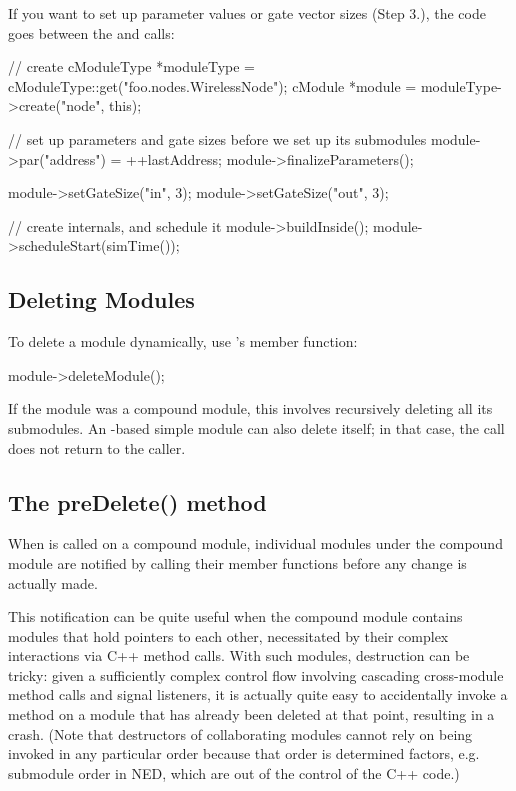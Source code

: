 If you want to set up parameter values or gate vector sizes (Step 3.),
the code goes between the  and
 calls:

\begin{cpp}
// create
cModuleType *moduleType = cModuleType::get("foo.nodes.WirelessNode");
cModule *module = moduleType->create("node", this);

// set up parameters and gate sizes before we set up its submodules
module->par("address") = ++lastAddress;
module->finalizeParameters();

module->setGateSize("in", 3);
module->setGateSize("out", 3);

// create internals, and schedule it
module->buildInside();
module->scheduleStart(simTime());
\end{cpp}


\subsection{Deleting Modules}
\label{sec:simple-modules:deleting-modules}

To delete a module dynamically, use
's  member function:

\begin{cpp}
module->deleteModule();
\end{cpp}

If the module was a compound module, this involves recursively
deleting all its submodules. An -based simple module
can also delete itself; in that case, the  call
does not return to the caller.


\subsection{The preDelete() method}
\label{sec:simple-modules:predelete}

When  is called on a compound module, individual modules
under the compound module are notified by calling their 
member functions before any change is actually made.

This notification can be quite useful when the compound module contains modules
that hold pointers to each other, necessitated by their complex interactions via
C++ method calls. With such modules, destruction can be tricky: given a
sufficiently complex control flow involving cascading cross-module method calls
and signal listeners, it is actually quite easy to accidentally invoke a method
on a module that has already been deleted at that point, resulting in a crash.
(Note that destructors of collaborating modules cannot rely on being invoked in
any particular order because that order is determined factors, e.g. submodule
order in NED, which are out of the control of the C++ code.)

